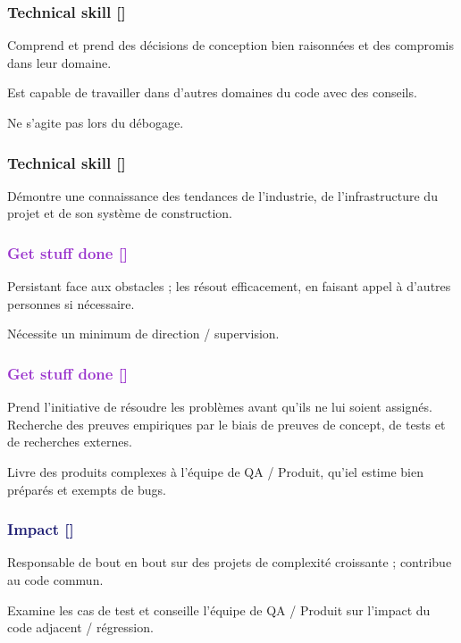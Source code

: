 \documentclass[a4paper, french, openany, 12pt]{book}
\newcommand\dex{\textcolor{BrickRed}{\textbf{Technical skill [\bsc{DEX}]}}}
\newcommand\str{\textcolor{DarkOrchid}{\textbf{Get stuff done [\bsc{STR}]}}}
\newcommand\wis{\textcolor{MidnightBlue}{\textbf{Impact [\bsc{WIS}]}}}
\begin{document}
\begin{multicols}{2}

  \subsubsection*{\dex}

  Comprend et prend des décisions de conception bien raisonnées et des compromis dans leur domaine.

  Est capable de travailler dans d'autres domaines du code avec des conseils.

  Ne s'agite pas lors du débogage.

  \subsubsection*{\dex}

  Démontre une connaissance des tendances de l'industrie, de l'infrastructure du projet et de son système de construction.

  \subsubsection*{\str}

  Persistant face aux obstacles ; les résout efficacement, en faisant appel à d'autres personnes si nécessaire. 

  Nécessite un minimum de direction / supervision.

  \subsubsection*{\str}

  Prend l'initiative de résoudre les problèmes avant qu'ils ne lui soient assignés. 
  Recherche des preuves empiriques par le biais de preuves de concept, de tests et de recherches externes.

  Livre des produits complexes à l'équipe de QA / Produit, qu'iel estime bien préparés et exempts de bugs.

  \subsubsection*{\wis}

  Responsable de bout en bout sur des projets de complexité croissante ; contribue au code commun.

  Examine les cas de test et conseille l'équipe de QA / Produit sur l'impact du code adjacent / régression.


\end{multicols}
\end{document}
